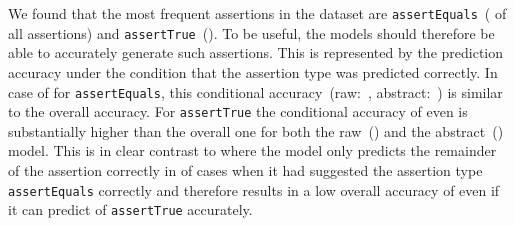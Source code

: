 We found that the most frequent assertions in the dataset are
\texttt{assertEquals}~( of all assertions) and
\texttt{assertTrue}~(). To be useful, the models should
therefore be able to accurately generate such assertions.
This is represented by the prediction accuracy under the condition
that the assertion type was predicted correctly. In case of
\assertfive for \texttt{assertEquals}, this conditional
accuracy~(raw:~, abstract:~) is similar to the
overall accuracy. For \texttt{assertTrue} the conditional accuracy of
\assertfive even is substantially higher than the overall one for both
the raw~() and the abstract~() model.
This is in clear contrast to \doprebart where the model only predicts
the remainder of the assertion correctly in  of cases when
it had suggested the assertion type \texttt{assertEquals} correctly
and therefore results in a low overall accuracy of  even if
it can predict  of \texttt{assertTrue} accurately.




